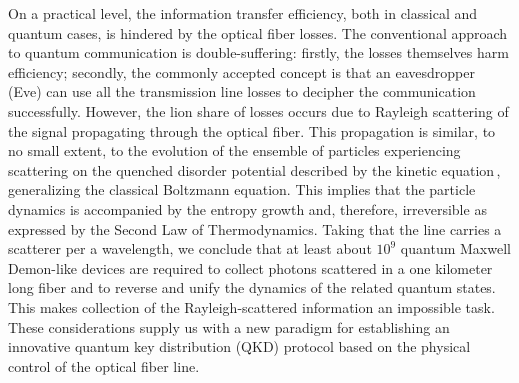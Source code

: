 \documentclass[a4paper]{article}
\begin{document}


On a practical level,  the information transfer efficiency, both in classical and quantum cases, is hindered by the optical fiber losses. 
The conventional approach to quantum communication is double-suffering:
firstly, the losses themselves harm efficiency; 
secondly, the commonly accepted concept is that an eavesdropper (Eve) can use all the transmission line losses to decipher the communication successfully.
However, the lion share of losses occurs due to Rayleigh scattering of the signal propagating through the optical fiber. 
This propagation is similar, to no small extent, to the evolution of the ensemble of particles experiencing scattering on the quenched disorder potential described by the kinetic equation\,\cite{Landau_X}, generalizing the classical Boltzmann equation. 
This implies that the particle dynamics is accompanied by the entropy growth and, therefore, irreversible as expressed by the Second Law of Thermodynamics. 
Taking that the line carries a scatterer per a wavelength, we conclude that at least about $10^9$ quantum Maxwell Demon-like devices are required to collect photons scattered in a one kilometer long fiber and to reverse and unify the dynamics of the related quantum states. 
This makes collection of the Rayleigh-scattered information an impossible task.
These considerations supply us with a new paradigm for establishing an innovative quantum key distribution (QKD) protocol based on the physical control of the optical fiber line.
\end{document}
